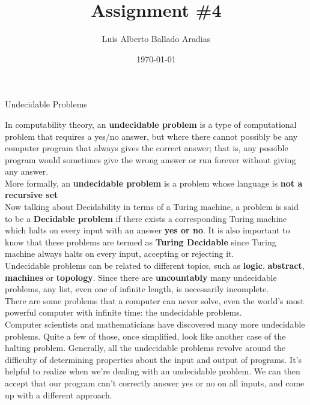 \documentclass[
	12pt, %
]{fphw}
\title{Assignment \#4} %
\author{Luis Alberto Ballado Aradias} %
\date{\today} %
\institute{Centro de Investigación y de Estudios Avanzados del IPN \\ Unidad Tamaulipas} %
\begin{document}
\maketitle %

{\color{teal}
\dotfill
Undecidable Problems
\dotfill}

In computability theory, an \textbf{undecidable problem} is a type of computational problem that requires a yes/no answer, but where there cannot possibly be any computer program that always gives the correct answer; that is, any possible program would sometimes give the wrong answer or run forever without giving any answer.\\
More formally, an \textbf{undecidable problem} is a problem whose language is \textbf{not a recursive set}\\

Now talking about Decidability in terms of a Turing machine, a problem is said to be a \textbf{Decidable problem} if there exists a corresponding Turing machine which halts on every input with an answer \textbf{yes or no}. It is also important to know that these problems are termed as \textbf{Turing Decidable} since Turing machine always halts on every input, accepting or rejecting it.\\

Undecidable problems can be related to different topics, such as \textbf{logic}, \textbf{abstract}, \textbf{machines} or \textbf{topology}. Since there are \textbf{uncountably} many undecidable problems, any list, even one of infinite length, is necessarily incomplete.\\

There are some problems that a computer can never solve, even the world's most powerful computer with infinite time: the undecidable problems.\\

Computer scientists and mathematicians have discovered many more undecidable problems. Quite a few of those, once simplified, look like another case of the halting problem. Generally, all the undecidable problems revolve around the difficulty of determining properties about the input and output of programs. It's helpful to realize when we're dealing with an undecidable problem. We can then accept that our program can't correctly answer yes or no on all inputs, and come up with a different approach.
\end{document}
